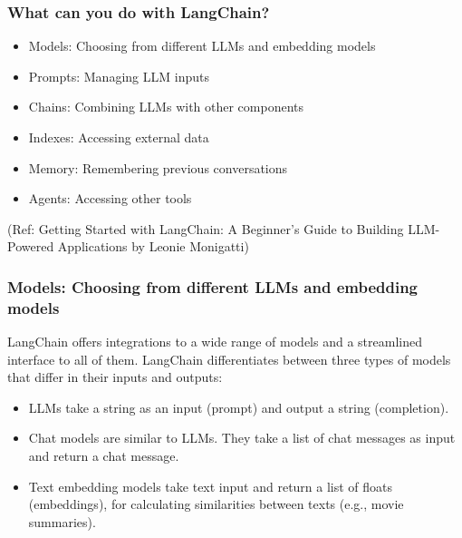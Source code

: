\begin{frame}[fragile]\frametitle{What can you do with LangChain?}

\begin{itemize}
\item Models: Choosing from different LLMs and embedding models
\item Prompts: Managing LLM inputs
\item Chains: Combining LLMs with other components
\item Indexes: Accessing external data
\item Memory: Remembering previous conversations
\item Agents: Accessing other tools
\end{itemize}

{\tiny (Ref: Getting Started with LangChain: A Beginner’s Guide to Building LLM-Powered Applications by Leonie Monigatti)}

\end{frame}


\begin{frame}[fragile]\frametitle{Models: Choosing from different LLMs and embedding models}

LangChain offers integrations to a wide range of models and a streamlined interface to all of them. LangChain differentiates between three types of models that differ in their inputs and outputs:

\begin{itemize}
\item LLMs take a string as an input (prompt) and output a string (completion).
\item Chat models are similar to LLMs. They take a list of chat messages as input and return a chat message.
\item Text embedding models take text input and return a list of floats (embeddings), for calculating similarities between texts (e.g., movie summaries).
\end{itemize}

\end{frame}

